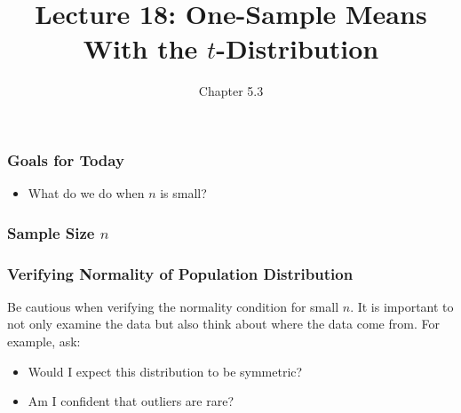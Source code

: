 \documentclass[handout]{beamer}
\title{Lecture 18: One-Sample Means With the $t$-Distribution}
\author{Chapter 5.3}
\date{}
\newcommand{\blue}[1]{\textcolor{blue2}{#1}}
\newcommand{\xbar}{\overline{x}}
\begin{document}
\begin{frame}
\titlepage
\end{frame}


\begin{frame}[fragile]
\frametitle{Goals for Today}

\begin{itemize}
\item What do we do when $n$ is small?  
\end{itemize}

\end{frame}


\begin{frame}[fragile]
\frametitle{Sample Size $n$}
%
%
%

\end{frame}


\begin{frame}[fragile]
\frametitle{Verifying Normality of Population Distribution}

Be cautious when verifying the normality condition for small $n$. It is important to not only examine the data but also think about where the data come from. For example, ask:
\begin{itemize}
\item Would I expect this distribution to be symmetric?
\item Am I confident that outliers are rare?
\end{itemize}

\end{frame}
\end{document}
